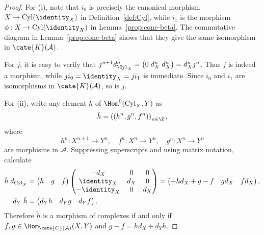 \begin{proof}
	For (i), note that $i_0$ is precisely the canonical morphism
	$X\to\mathrm{Cyl}(\identity_X)$ in Definition~\ref{def:Cyl}, while $i_1$
	is the morphism $\phi:X\to\mathrm{Cyl}(\identity_X)$ in
	Lemma~\ref{prop:cone-beta}. The commutative diagram in
	Lemma~\ref{prop:cone-beta} shows that they give the same isomorphism in
	$\cate{K}(\mathcal{A})$.

	For $j$, it is easy to verify that
	$j^{n+1}d_{\Cyl_X}^n=\bigl(0\;d_X^n\;d_X^n\bigr)=d_X^nj^n$. Thus $j$ is
	indeed a morphism, while $ji_0=\identity_X=ji_1$ is immediate. Since
	$i_0$ and $i_1$ are isomorphisms in $\cate{K}(\mathcal{A})$, so is $j$.

	For (ii), write any element $\tilde{h}$ of
	$\Hom^0(\mathrm{Cyl}_X,Y)$ as
	\[
		\tilde{h}=\left((h^n,g^n,f^n)\right)_{n\in\Z},
	\]
	where
	\[ h^n: X^{n+1} \to Y^n, \quad f^n: X^n \to Y^n, \quad g^n: X^n \to Y^n \]
	are morphisms in $\mathcal{A}$. Suppressing superscripts and using matrix
	notation, calculate
	\begin{align*}
		\tilde{h} \; d_{\mathrm{Cyl}_X} & = \begin{pmatrix} h & g & f \end{pmatrix} \begin{pmatrix} -d_X & 0 & 0 \\ \identity_X & d_X & 0 \\ -\identity_X & 0 & d_X \end{pmatrix} = \begin{pmatrix} -hd_X + g - f & g d_X & f d_X \end{pmatrix} , \\
		d_Y \; \tilde{h} & = \begin{pmatrix} d_Y h & d_Y g & d_Y f \end{pmatrix}.
	\end{align*}
	Therefore $\tilde{h}$ is a morphism of complexes if and only if
	$f,g\in\Hom_{\cate{C}(\mathcal{A})}(X,Y)$ and
	$g-f=hd_X+d_Yh$.
\end{proof}

